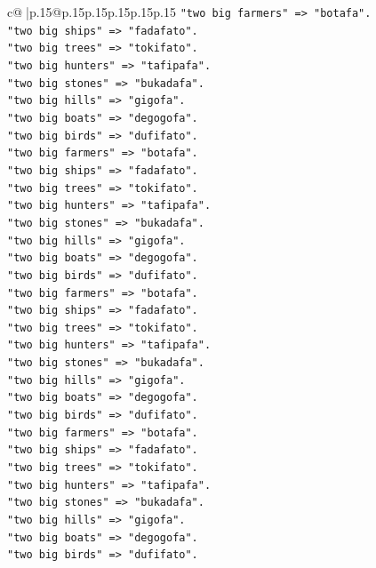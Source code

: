 \documentclass{article}
\begin{document}
{\begin{supertabular}{c@{$\;$}|p{.15\linewidth}@{}p{.15\linewidth}p{.15\linewidth}p{.15\linewidth}p{.15\linewidth}p{.15\linewidth}}
{{{\texttt{"two big farmers" => "botafa".} \\
\texttt{"two big ships" => "fadafato".} \\
\texttt{"two big trees" => "tokifato".} \\
\texttt{"two big hunters" => "tafipafa".} \\
\texttt{"two big stones" => "bukadafa".} \\
\texttt{"two big hills" => "gigofa".} \\
\texttt{"two big boats" => "degogofa".} \\
\texttt{"two big birds" => "dufifato".} \\
\texttt{"two big farmers" => "botafa".} \\
\texttt{"two big ships" => "fadafato".} \\
\texttt{"two big trees" => "tokifato".} \\
\texttt{"two big hunters" => "tafipafa".} \\
\texttt{"two big stones" => "bukadafa".} \\
\texttt{"two big hills" => "gigofa".} \\
\texttt{"two big boats" => "degogofa".} \\
\texttt{"two big birds" => "dufifato".} \\
\texttt{"two big farmers" => "botafa".} \\
\texttt{"two big ships" => "fadafato".} \\
\texttt{"two big trees" => "tokifato".} \\
\texttt{"two big hunters" => "tafipafa".} \\
\texttt{"two big stones" => "bukadafa".} \\
\texttt{"two big hills" => "gigofa".} \\
\texttt{"two big boats" => "degogofa".} \\
\texttt{"two big birds" => "dufifato".} \\
\texttt{"two big farmers" => "botafa".} \\
\texttt{"two big ships" => "fadafato".} \\
\texttt{"two big trees" => "tokifato".} \\
\texttt{"two big hunters" => "tafipafa".} \\
\texttt{"two big stones" => "bukadafa".} \\
\texttt{"two big hills" => "gigofa".} \\
\texttt{"two big boats" => "degogofa".} \\
\texttt{"two big birds" => "dufifato".} \\
}}}
\end{supertabular}}
\end{document}
